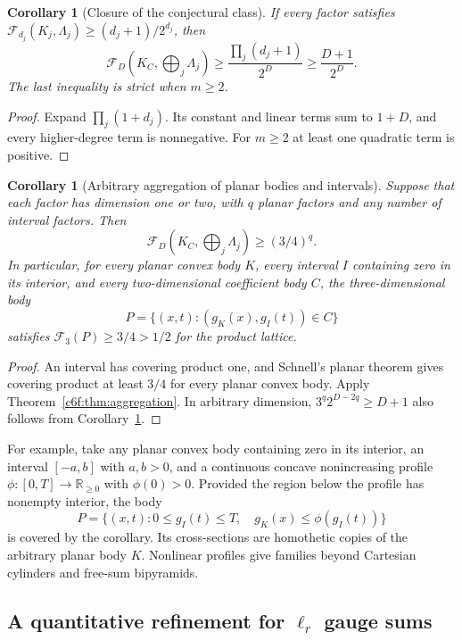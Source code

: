 \documentclass[11pt,a4paper]{article}
\newtheorem{corollary}[theorem]{Corollary}
\theoremstyle{remark}\newtheorem{remark}[theorem]{Remark}
\begin{document}
\begin{corollary}[Closure of the conjectural class]
\label{c6f:cor:Fclosure}
If every factor satisfies
$\mathcal F_{d_j}(K_j,\Lambda_j)\ge(d_j+1)/2^{d_j}$, then
\[
 \mathcal F_D(K_C,\bigoplus_j\Lambda_j)
   \ge\frac{\prod_j(d_j+1)}{2^D}
   \ge\frac{D+1}{2^D}.
\]
The last inequality is strict when $m\ge2$.
\end{corollary}

\begin{proof}
Expand $\prod_j(1+d_j)$.  Its constant and linear terms sum to
$1+D$, and every higher-degree term is nonnegative.  For $m\ge2$
at least one quadratic term is positive.
\end{proof}

\begin{corollary}[Arbitrary aggregation of planar bodies and intervals]
\label{c6f:cor:planar-factors}
Suppose that each factor has dimension one or two, with $q$ planar
factors and any number of interval factors.  Then
\[
 \mathcal F_D(K_C,\bigoplus_j\Lambda_j)\ge(3/4)^q.
\]
In particular, for every planar convex body $K$, every interval
$I$ containing zero in its interior, and every two-dimensional
coefficient body $C$, the three-dimensional body
\[
 P=\{(x,t):(g_K(x),g_I(t))\in C\}
\]
satisfies $\mathcal F_3(P)\ge3/4>1/2$ for the product lattice.
\end{corollary}

\begin{proof}
An interval has covering product one, and Schnell's planar theorem
gives covering product at least $3/4$ for every planar convex body.
Apply Theorem~\ref{c6f:thm:aggregation}.  In arbitrary dimension,
$3^q2^{D-2q}\ge D+1$ also follows from
Corollary~\ref{c6f:cor:Fclosure}.
\end{proof}

For example, take any planar convex body containing zero in its
interior, an interval $[-a,b]$ with $a,b>0$, and a continuous concave
nonincreasing profile $\phi:[0,T]\to\mathbb R_{\ge0}$ with
$\phi(0)>0$.  Provided the region below the profile has nonempty
interior, the body
\[
 P=\{(x,t):0\le g_I(t)\le T,\quad
                         g_K(x)\le\phi(g_I(t))\}
\]
is covered by the corollary.  Its cross-sections are homothetic
copies of the arbitrary planar body $K$.  Nonlinear profiles give
families beyond Cartesian cylinders and free-sum bipyramids.

\subsection{A quantitative refinement for \texorpdfstring{$\ell_r$}{ell-r} gauge sums}
\end{document}
